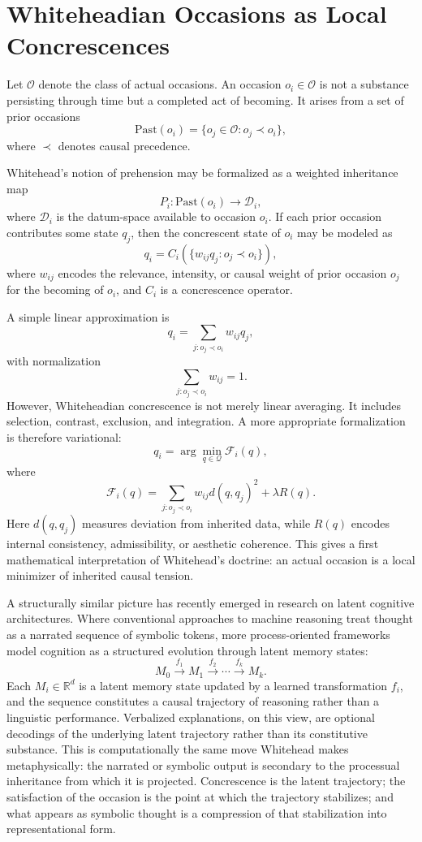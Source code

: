 \documentclass[12pt,a4paper]{article}
\begin{document}
\section{Whiteheadian Occasions as Local Concrescences}

Let \(\mathcal{O}\) denote the class of actual occasions. An occasion \(o_i \in \mathcal{O}\) is not a substance persisting through time but a completed act of becoming. It arises from a set of prior occasions
\[
\mathrm{Past}(o_i) = \{o_j \in \mathcal{O} : o_j \prec o_i\},
\]
where \(\prec\) denotes causal precedence.

Whitehead's notion of prehension may be formalized as a weighted inheritance map
\[
P_i : \mathrm{Past}(o_i) \to \mathcal{D}_i,
\]
where \(\mathcal{D}_i\) is the datum-space available to occasion \(o_i\). If each prior occasion contributes some state \(q_j\), then the concrescent state of \(o_i\) may be modeled as
\[
q_i = C_i\left(\{w_{ij} q_j : o_j \prec o_i\}\right),
\]
where \(w_{ij}\) encodes the relevance, intensity, or causal weight of prior occasion \(o_j\) for the becoming of \(o_i\), and \(C_i\) is a concrescence operator.

A simple linear approximation is
\[
q_i = \sum_{j : o_j \prec o_i} w_{ij} q_j,
\]
with normalization
\[
\sum_{j : o_j \prec o_i} w_{ij} = 1.
\]
However, Whiteheadian concrescence is not merely linear averaging. It includes selection, contrast, exclusion, and integration. A more appropriate formalization is therefore variational:
\[
q_i = \arg\min_{q \in \mathcal{Q}} \mathcal{F}_i(q),
\]
where
\[
\mathcal{F}_i(q)
=
\sum_{j : o_j \prec o_i} w_{ij} d(q,q_j)^2
+
\lambda R(q).
\]
Here \(d(q,q_j)\) measures deviation from inherited data, while \(R(q)\) encodes internal consistency, admissibility, or aesthetic coherence. This gives a first mathematical interpretation of Whitehead's doctrine: an actual occasion is a local minimizer of inherited causal tension.

A structurally similar picture has recently emerged in research on latent cognitive architectures. Where conventional approaches to machine reasoning treat thought as a narrated sequence of symbolic tokens, more process-oriented frameworks model cognition as a structured evolution through latent memory states:
\[
M_0 \xrightarrow{f_1} M_1 \xrightarrow{f_2} \cdots \xrightarrow{f_k} M_k.
\]
Each \(M_i \in \mathbb{R}^d\) is a latent memory state updated by a learned transformation \(f_i\), and the sequence constitutes a causal trajectory of reasoning rather than a linguistic performance. Verbalized explanations, on this view, are optional decodings of the underlying latent trajectory rather than its constitutive substance. This is computationally the same move Whitehead makes metaphysically: the narrated or symbolic output is secondary to the processual inheritance from which it is projected. Concrescence is the latent trajectory; the satisfaction of the occasion is the point at which the trajectory stabilizes; and what appears as symbolic thought is a compression of that stabilization into representational form.
\end{document}
